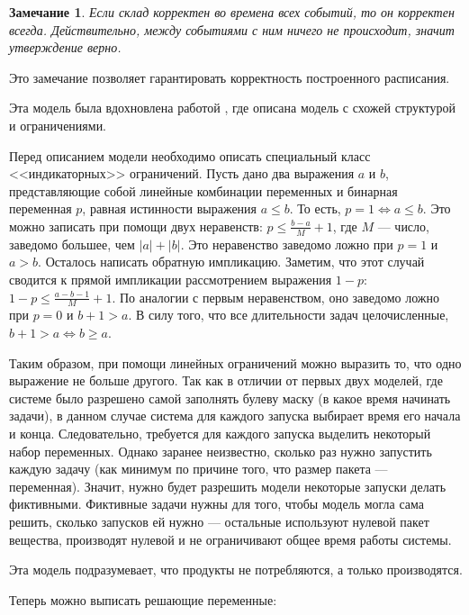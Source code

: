 \documentclass[12pt, twoside]{article}
\newtheorem*{remark}{Замечание}
\theoremstyle{definition}
\begin{document}
\begin{remark}
Если склад корректен во времена всех событий, то он корректен всегда. Действительно, между событиями с ним ничего не происходит, значит утверждение верно.
\end{remark}

Это замечание позволяет гарантировать корректность построенного расписания.

Эта модель была вдохновлена работой \cite{precendancebased}, где описана модель с схожей структурой и ограничениями.

Перед описанием модели необходимо описать специальный класс <<индикаторных>> ограничений. Пусть дано два выражения $a$ и $b$, представляющие собой линейные комбинации переменных и бинарная переменная $p$, равная истинности выражения $a \leq b$. То есть, $p = 1 \Leftrightarrow a \leq b$. Это можно записать при помощи двух неравенств: $p \leq \frac{b-a}{M} + 1$, где $M$ --- число, заведомо большее, чем $|a| + |b|$. Это неравенство заведомо ложно при $p = 1$ и $a > b$. Осталось написать обратную импликацию. Заметим, что этот случай сводится к прямой импликации рассмотрением выражения $1 - p$: $1 - p \leq \frac{a - b - 1}{M} + 1$. По аналогии с первым неравенством, оно заведомо ложно при $p = 0$ и $b + 1 > a$. В силу того, что все длительности задач целочисленные, $b + 1 > a \Leftrightarrow b \geq a$.

Таким образом, при помощи линейных ограничений можно выразить то, что одно выражение не больше другого. Так как в отличии от первых двух моделей, где системе было разрешено самой заполнять булеву маску (в какое время начинать задачи), в данном случае система для каждого запуска выбирает время его начала и конца. Следовательно, требуется для каждого запуска выделить некоторый набор переменных. Однако заранее неизвестно, сколько раз нужно запустить каждую задачу (как минимум по причине того, что размер пакета --- переменная). Значит, нужно будет разрешить модели некоторые запуски делать фиктивными. Фиктивные задачи нужны для того, чтобы модель могла сама решить, сколько запусков ей нужно --- остальные используют нулевой пакет вещества, производят нулевой и не ограничивают общее время работы системы.

Эта модель подразумевает, что продукты не потребляются, а только производятся.

Теперь можно выписать решающие переменные:
\end{document}
